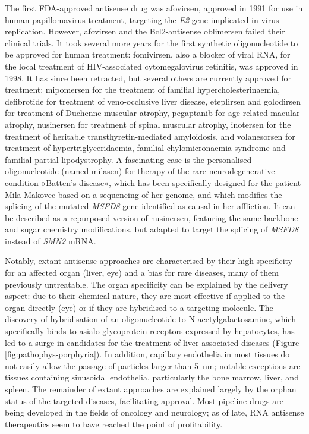 The first FDA-approved antisense drug was afovirsen, approved in 1991 for use in human papillomavirus treatment, targeting the \emph{E2} gene implicated in virus replication. However, afovirsen and the Bcl2-antisense oblimersen failed their clinical trials. It took several more years for the first synthetic oligonucleotide to be approved for human treatment: fomivirsen, also a blocker of viral RNA, for the local treatment of HIV-associated cytomegalovirus retinitis, was approved in 1998.\cite{Piascik1999} It has since been retracted, but several others are currently approved for treatment: mipomersen for the treatment of familial hypercholesterinaemia, defibrotide for treatment of veno-occlusive liver disease, eteplirsen and golodirsen for treatment of Duchenne muscular atrophy, pegaptanib for age-related macular atrophy, nusinersen for treatment of spinal muscular atrophy, inotersen for the treatment of heritable transthyretin-mediated amyloidosis, and volanesorsen for treatment of hypertriglyceridaemia, familial chylomicronaemia syndrome and familial partial lipodystrophy.\cite{Sharad2019, Wang2020} A fascinating case is the personalised oligonucleotide (named milasen) for therapy of the rare neurodegenerative condition »Batten's disease«, which has been specifically designed for the patient Mila Makovec based on a sequencing of her genome, and which modifies the splicing of the mutated \emph{MSFD8} gene identified as causal in her affliction.\cite{Kim2019} It can be described as a repurposed version of nusinersen, featuring the same backbone and sugar chemistry modifications, but adapted to target the splicing of \emph{MSFD8} instead of \emph{SMN2} mRNA.

Notably, extant antisense approaches are characterised by their high specificity for an affected organ (liver, eye) and a bias for rare diseases, many of them previously untreatable. The organ specificity can be explained by the delivery aspect: due to their chemical nature, they are most effective if applied to the organ directly (eye) or if they are hybridised to a targeting molecule. The discovery of hybridisation of an oligonucleotide to N-acetylgalactosamine, which specifically binds to asialo-glycoprotein receptors expressed by hepatocytes, has led to a surge in candidates for the treatment of liver-associated diseases (Figure \ref{fig:pathophys-porphyria}).\cite{Wang2020} In addition, capillary endothelia in most tissues do not easily allow the passage of particles larger than \SI{5}{\nano\metre}; notable exceptions are tissues containing sinusoidal endothelia, particularly the bone marrow, liver, and spleen.\cite{Gullotti2009, Hassanshahi2019} The remainder of extant approaches are explained largely by the orphan status of the targeted diseases, facilitating approval. Most pipeline drugs are being developed in the fields of oncology and neurology; as of late, RNA antisense therapeutics seem to have reached the point of profitability.\cite{Wang2020} 

